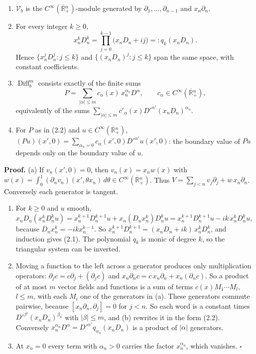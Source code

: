 \documentclass[
  11pt,
]{article}
\begin{document}
\begin{enumerate}
\def\labelenumi{(\alph{enumi})}
\item
  \(\mathcal V_b\) is the
  \(C^\infty(\overline{\mathbb R}{}^n_+)\)-module generated by
  \(\partial_1,\ldots,\partial_{n-1}\) and \(x_n\partial_n\).
\item
  For every integer \(k\geq0\), \[
x_n^kD_n^k=\prod_{j=0}^{k-1}\big(x_nD_n+ij\big)=:q_k(x_nD_n).
\tag{2.1}
\] Hence \(\{x_n^jD_n^j:j\leq k\}\) and \(\{(x_nD_n)^j:j\leq k\}\)
  span the same space, with constant coefficients.
\item
  \(\operatorname{Diff}^m_b\) consists exactly of the finite sums \[
P=\sum_{|\alpha|\leq m}c_\alpha(x)\,x_n^{\alpha_n}D^\alpha,\qquad c_\alpha\in C^\infty(\overline{\mathbb R}{}^n_+),
\tag{2.2}
\] equivalently of the sums
  \(\sum_{|\alpha|\leq m}c'_\alpha(x)D'^{\alpha'}(x_nD_n)^{\alpha_n}\).
\item
  For \(P\) as in (2.2) and
  \(u\in C^\infty(\overline{\mathbb R}{}^n_+)\),
  \((Pu)(x',0)=\sum_{\alpha_n=0}c_\alpha(x',0)D'^{\alpha'}u(x',0)\): the
  boundary value of \(Pu\) depends only on the boundary value of \(u\).
\end{enumerate}

\textbf{Proof.} (a) If \(v_n(x',0)=0\), then \(v_n(x)=x_nw(x)\) with
\(w(x)=\int_0^1(\partial_nv_n)(x',\theta x_n)\,d\theta\in C^\infty(\overline{\mathbb R}{}^n_+)\).
Thus \(V=\sum_{j<n}v_j\partial_j+w\,x_n\partial_n\). Conversely each
generator is tangent.

\begin{enumerate}
\def\labelenumi{(\alph{enumi})}
\setcounter{enumi}{1}
\item
  For \(k\geq0\) and \(u\) smooth,
  \(x_nD_n(x_n^kD_n^ku)=x_n^{k+1}D_n^{k+1}u+x_n(D_nx_n^k)D_n^ku=x_n^{k+1}D_n^{k+1}u-ik\,x_n^kD_n^ku\),
  because \(D_nx_n^k=-ikx_n^{k-1}\). So
  \(x_n^{k+1}D_n^{k+1}=(x_nD_n+ik)\,x_n^kD_n^k\), and induction gives
  (2.1). The polynomial \(q_k\) is monic of degree \(k\), so the
  triangular system can be inverted.
\item
  Moving a function to the left across a generator produces only
  multiplication operators: \(\partial_jc=c\partial_j+(\partial_jc)\)
  and \(x_n\partial_nc=c\,x_n\partial_n+x_n(\partial_nc)\). So a product
  of at most \(m\) vector fields and functions is a sum of terms
  \(c(x)M_1\cdots M_l\), \(l\leq m\), with each \(M_i\) one of the
  generators in (a). These generators commute pairwise, because
  \([x_n\partial_n,\partial_j]=0\) for \(j<n\). So each word is a
  constant times \(D'^{\beta'}(x_nD_n)^{\beta_n}\) with
  \(|\beta|\leq m\), and (b) rewrites it in the form (2.2). Conversely
  \(x_n^{\alpha_n}D^\alpha=D'^{\alpha'}q_{\alpha_n}(x_nD_n)\) is a
  product of \(|\alpha|\) generators.
\item
  At \(x_n=0\) every term with \(\alpha_n>0\) carries the factor
  \(x_n^{\alpha_n}\), which vanishes. \(\square\)
\end{enumerate}
\end{document}

